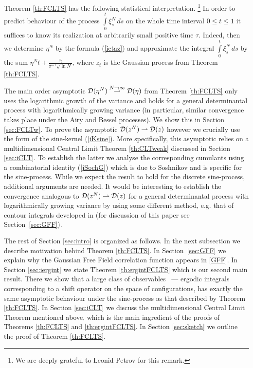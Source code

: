 \documentclass{article}
\numberwithin{equation}{section}
\newcommand{\DD}{{\cal D}}
\newcommand{\ds}{\displaystyle{}}
\newcommand{\ra}{\rightarrow}
\newcommand{\raw}{\rightharpoonup}
\newcommand{\fr}{\frac}
\newcommand{\ili}{\int\limits}
\newcommand{\rtheo}{Theorem \nolinebreak}
\newcommand{\rsec}{Section \nolinebreak}
\begin{document}
\rtheo\ref{th:FCLTS} has the following statistical interpretation.
\footnote{We are deeply grateful to Leonid Petrov for this remark.}
In order to predict behaviour of the process
$\ili_0^t \xi^N_s \, ds$ on the whole time interval $0\leq t\leq 1$
it suffices to know its realization at
arbitrarily small positive time $\tau$.
Indeed, then we determine $\eta^N$ by the formula (\ref{ietaz})
and approximate the integral $\ili_0^t \xi^N_s \, ds$
by the sum $\ds{\eta^N t+\fr{z_t}{\pi^{-1}\sqrt{\ln N}}}$,
where $z_t$ is the Gaussian process from \rtheo \ref{th:FCLTS}.

The main order asymptotic
$\DD(\eta^N)\overset{N\ra\infty}\raw\DD(\eta)$
from \rtheo\ref{th:FCLTS}
only uses the logarithmic growth of the variance
and holds for a general determinantal process
with logarithmically growing variance
(in particular, similar convergence takes place under the Airy and Bessel processes).
We show this in \rsec\ref{sec:FCLTw}.
To prove the asymptotic
$\DD(z^N)\raw\DD(z)$ however
we crucially use the form of the sine-kernel (\ref{iKsine}).
More specifically,
this asymptotic relies on a multidimensional Central Limit \rtheo \ref{th:CLTweak}
discussed in \rsec \ref{sec:iCLT}.
To establish the latter we analyse the corresponding cumulants
using a combinatorial identity (\ref{jSochG}) which is due to Soshnikov \cite{So00b}
and is specific for the sine-process.
While we expect the result to hold for the discrete sine-process,
additional arguments are needed.
It would be interesting to establish the convergence analogous to
$\DD(z^N)\raw\DD(z)$ for a general determinantal process with logarithmically growing variance
by using some different method, e.g. that of contour integrals developed in \cite{BF} (for discussion of this paper see Section~\ref{sec:GFF}).


The rest of \rsec\ref{sec:intro} is organized as follows.
In the next subsection we
describe motivation behind \rtheo\ref{th:FCLTS}.
In Section~\ref{sec:GFF} we explain why the Gaussian Free Field correlation function appears in \eqref{GFF}.
In \rsec \ref{sec:iergint} we state \rtheo\ref{th:ergintFCLTS}
which is our second main result.
There we show that a large class of observables ~---
ergodic integrals corresponding to a shift operator on the space of configurations,
has exactly the same asymptotic behaviour under the sine-process
as that described by \rtheo\ref{th:FCLTS}.
In \rsec\ref{sec:iCLT} we discuss the multidimensional Central Limit Theorem
mentioned above,
which is the main ingredient of the proofs of
Theorems \nolinebreak \ref{th:FCLTS} and \ref{th:ergintFCLTS}.
In \rsec\ref{sec:sketch} we outline the proof of \rtheo  \ref{th:FCLTS}.
\end{document}
